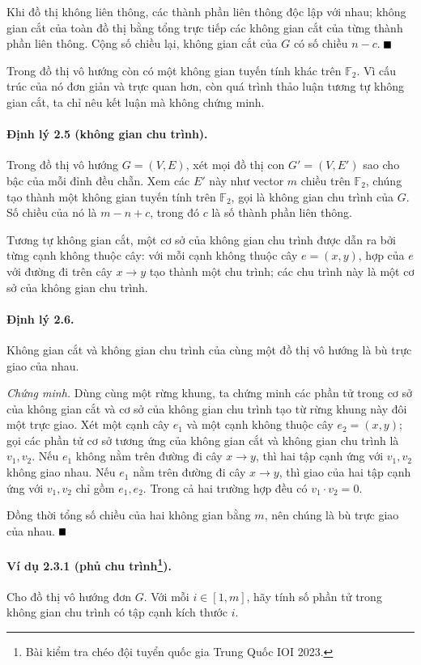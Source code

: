 \documentclass[11pt]{article}
\renewcommand{\leadsto}{\mathrel{\longrightarrow}}
\providecommand{\square}{\mathord{\vcenter{\hrule height .6em width .6em}}}
\begin{document}
Khi đồ thị không liên thông, các thành phần liên thông độc lập với nhau; không
gian cắt của toàn đồ thị bằng tổng trực tiếp các không gian cắt của từng thành
phần liên thông. Cộng số chiều lại, không gian cắt của $G$ có số chiều
$n-c$. \hfill$\square$

Trong đồ thị vô hướng còn có một không gian tuyến tính khác trên $\mathbb F_2$.
Vì cấu trúc của nó đơn giản và trực quan hơn, còn quá trình thảo luận tương tự
không gian cắt, ta chỉ nêu kết luận mà không chứng minh.

\paragraph{Định lý 2.5 (không gian chu trình).}
Trong đồ thị vô hướng $G=(V,E)$, xét mọi đồ thị con $G'=(V,E')$ sao cho bậc của
mỗi đỉnh đều chẵn. Xem các $E'$ này như vector $m$ chiều trên $\mathbb F_2$,
chúng tạo thành một không gian tuyến tính trên $\mathbb F_2$, gọi là không gian
chu trình của $G$. Số chiều của nó là $m-n+c$, trong đó $c$ là số thành phần
liên thông.

Tương tự không gian cắt, một cơ sở của không gian chu trình được dẫn ra bởi từng
cạnh không thuộc cây: với mỗi cạnh không thuộc cây $e=(x,y)$, hợp của $e$ với
đường đi trên cây $x\leadsto y$ tạo thành một chu trình; các chu trình này là
một cơ sở của không gian chu trình.

\paragraph{Định lý 2.6.}
Không gian cắt và không gian chu trình của cùng một đồ thị vô hướng là bù trực
giao của nhau.

\emph{Chứng minh.}
Dùng cùng một rừng khung, ta chứng minh các phần tử trong cơ sở của không gian
cắt và cơ sở của không gian chu trình tạo từ rừng khung này đôi một trực giao.
Xét một cạnh cây $e_1$ và một cạnh không thuộc cây $e_2=(x,y)$; gọi các phần tử
cơ sở tương ứng của không gian cắt và không gian chu trình là $v_1,v_2$. Nếu
$e_1$ không nằm trên đường đi cây $x\leadsto y$, thì hai tập cạnh ứng với
$v_1,v_2$ không giao nhau. Nếu $e_1$ nằm trên đường đi cây $x\leadsto y$, thì
giao của hai tập cạnh ứng với $v_1,v_2$ chỉ gồm $e_1,e_2$. Trong cả hai trường
hợp đều có $v_1\cdot v_2=0$.

Đồng thời tổng số chiều của hai không gian bằng $m$, nên chúng là bù trực giao
của nhau. \hfill$\square$

\paragraph{Ví dụ 2.3.1 (phủ chu trình\protect\footnote{Bài kiểm tra chéo đội tuyển quốc gia Trung Quốc IOI 2023.}).}
Cho đồ thị vô hướng đơn $G$. Với mỗi $i\in[1,m]$, hãy tính số phần tử trong
không gian chu trình có tập cạnh kích thước $i$.
\end{document}
